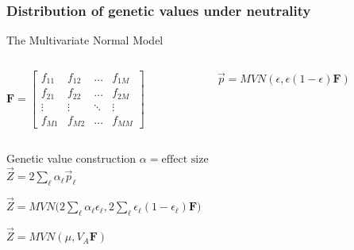 \documentclass{beamer}
\begin{document}
\begin{frame}
  \frametitle{Distribution of genetic values under neutrality}
\begin{block}{The Multivariate Normal Model}	
		\begin{columns}
		\begin{column}{0.5\textwidth}
		$\mathbf{F} = \begin{bmatrix}
							f_{11}&f_{12}&\dots& f_{1M} \\
							f_{21}&f_{22}&\dots& f_{2M} \\
							\vdots& \vdots& \ddots& \vdots \\
							f_{M1}& f_{M2}& \dots& f_{MM}
					\end{bmatrix}$
		\end{column}

		\begin{column}{0.5\textwidth}

						$\vec{p}  =  MVN(\epsilon,  \epsilon ( 1 - \epsilon ) \mathbf{F})$ \\
		\end{column}
		\end{columns}
\end{block}
\vskip 0.5cm
	\begin{block}{Genetic value construction}
						$\alpha = \text{effect size}$ \\
						$\vec{Z} = 2\sum_\ell \alpha_\ell \vec{p}_{\ell}$
					\end{block}
\vskip 0.5cm

	\begin{block}
					
$ \vec{Z} =
                                                MVN \big( 2\sum_{\ell}
                                                \alpha_\ell
                                                \epsilon_{\ell},2\sum_{\ell}
                                                \epsilon_{\ell} ( 1 -
                                                \epsilon_{\ell} )
                                                \mathbf{F} \big)$

						$\vec{Z} =
                                                MVN(\mu, V_A \mathbf{F})$

					\end{block}


\end{frame}


                                                
\end{document}
